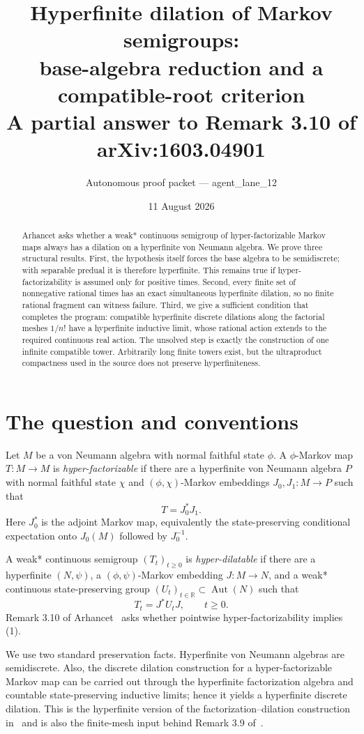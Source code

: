 \documentclass[11pt]{article}
\title{Hyperfinite dilation of Markov semigroups:\\
base-algebra reduction and a compatible-root criterion\\
\large A partial answer to Remark 3.10 of arXiv:1603.04901}
\author{Autonomous proof packet --- agent\_lane\_12}
\date{11 August 2026}
\newcommand{\R}{\mathbb R}
\newcommand{\Aut}{\operatorname{Aut}}
\begin{document}
\maketitle

\begin{abstract}
Arhancet asks whether a weak* continuous semigroup of hyper-factorizable
Markov maps always has a dilation on a hyperfinite von Neumann algebra.  We
prove three structural results.  First, the hypothesis itself forces the base
algebra to be semidiscrete; with separable predual it is therefore
hyperfinite.  This remains true if hyper-factorizability is assumed only for
positive times.  Second, every finite set of nonnegative rational times has
an exact simultaneous hyperfinite dilation, so no finite rational fragment
can witness failure.  Third, we give a sufficient condition that completes
the program: compatible hyperfinite discrete dilations along the factorial
meshes $1/n!$ have a hyperfinite inductive limit, whose rational action
extends to the required continuous real action.  The unsolved step is exactly
the construction of one infinite compatible tower.  Arbitrarily long finite
towers exist, but the ultraproduct compactness used in the source does not
preserve hyperfiniteness.
\end{abstract}

\section{The question and conventions}

Let $M$ be a von Neumann algebra with normal faithful state $\phi$.  A
$\phi$-Markov map $T:M\to M$ is \emph{hyper-factorizable} if there are a
hyperfinite von Neumann algebra $P$ with normal faithful state $\chi$ and
$(\phi,\chi)$-Markov embeddings $J_0,J_1:M\to P$ such that
\[
 T=J_0^*J_1.
\]
Here $J_0^*$ is the adjoint Markov map, equivalently the state-preserving
conditional expectation onto $J_0(M)$ followed by $J_0^{-1}$.

A weak* continuous semigroup $(T_t)_{t\geq0}$ is \emph{hyper-dilatable} if
there are a hyperfinite $(N,\psi)$, a $(\phi,\psi)$-Markov embedding
$J:M\to N$, and a weak* continuous state-preserving group
$(U_t)_{t\in\R}\subset\Aut(N)$ such that
\[
 T_t=J^*U_tJ,\qquad t\geq0.                         \tag{1}
\]
Remark 3.10 of Arhancet~\cite{Arhancet} asks whether pointwise
hyper-factorizability implies (1).

We use two standard preservation facts.  Hyperfinite von Neumann algebras
are semidiscrete.  Also, the discrete dilation construction for a
hyper-factorizable Markov map can be carried out through the hyperfinite
factorization algebra and countable state-preserving inductive limits; hence
it yields a hyperfinite discrete dilation.  This is the hyperfinite version
of the factorization--dilation construction in~\cite[Theorem 4.4]{HM} and is
also the finite-mesh input behind Remark 3.9 of~\cite{Arhancet}.
\end{document}
